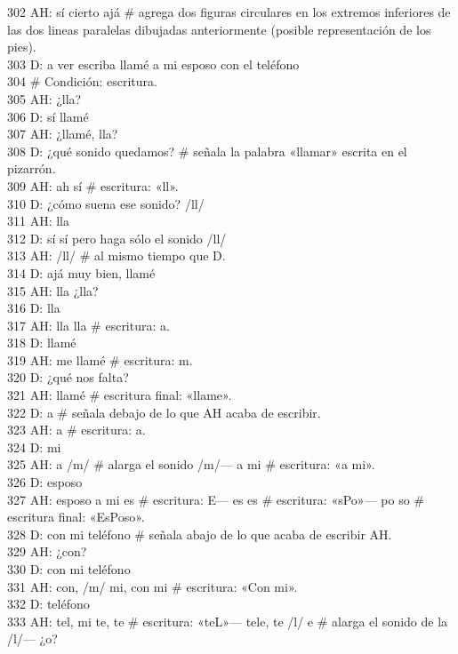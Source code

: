 302 AH: sí cierto ajá \# agrega dos figuras circulares en los extremos inferiores de las dos lineas paralelas dibujadas anteriormente (posible representación de los pies).\\
303 D: a ver escriba llamé a mi esposo con el teléfono\\
304 \# Condición: escritura.\\
305 AH: ¿lla?\\
306 D: sí llamé\\
307 AH: ¿llamé, lla?\\
308 D: ¿qué sonido quedamos? \# señala la palabra «llamar» escrita en el pizarrón.\\
309 AH: ah sí \# escritura: «ll».\\
310 D: ¿cómo suena ese sonido? /ll/\\
311 AH: lla\\
312 D: sí sí pero haga sólo el sonido /ll/\\
313 AH: /ll/ \# al mismo tiempo que D.\\
314 D: ajá muy bien, llamé\\
315 AH: lla ¿lla?\\
316 D: lla\\
317 AH: lla lla \# escritura: a.\\
318 D: llamé\\
319 AH: me llamé \# escritura: m.\\
320 D: ¿qué nos falta?\\
321 AH: llamé \# escritura final: «llame».\\
322 D: a \# señala debajo de lo que AH acaba de escribir.\\
323 AH: a \# escritura: a.\\
324 D: mi\\
325 AH: a /m/ \# alarga el sonido /m/--- a mi \# escritura: «a mi».\\
326 D: esposo\\
327 AH: esposo a mi es \# escritura: E--- es es \# escritura: «sPo»--- po so \# escritura final: «EsPoso».\\
328 D: con mi teléfono \# señala abajo de lo que acaba de escribir AH.\\
329 AH: ¿con?\\
330 D: con mi teléfono\\
331 AH: con, /m/ mi, con mi \# escritura: «Con mi».\\
332 D: teléfono\\
333 AH: tel, mi te, te \# escritura: «teL»--- tele, te /l/ e \# alarga el sonido de la /l/--- ¿o? \\
